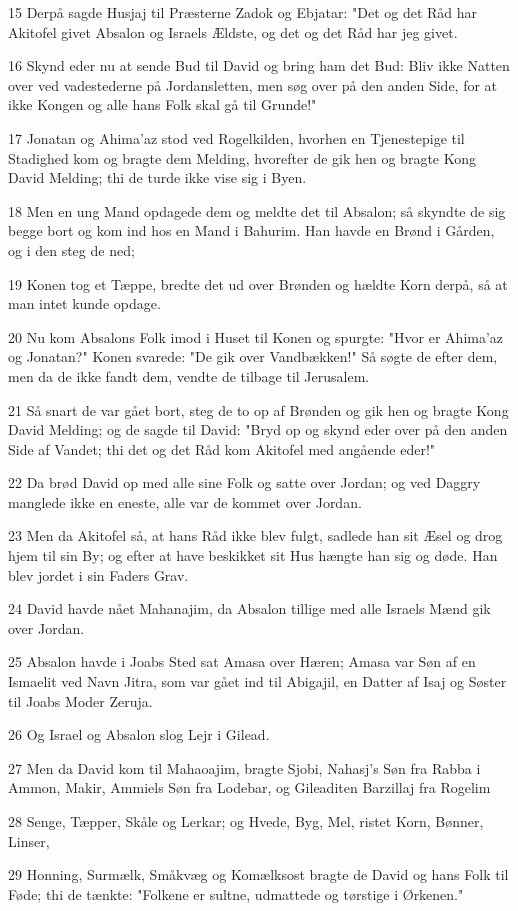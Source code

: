 \par 15 Derpå sagde Husjaj til Præsterne Zadok og Ebjatar: "Det og det Råd har Akitofel givet Absalon og Israels Ældste, og det og det Råd har jeg givet.
\par 16 Skynd eder nu at sende Bud til David og bring ham det Bud: Bliv ikke Natten over ved vadestederne på Jordansletten, men søg over på den anden Side, for at ikke Kongen og alle hans Folk skal gå til Grunde!"
\par 17 Jonatan og Ahima'az stod ved Rogelkilden, hvorhen en Tjenestepige til Stadighed kom og bragte dem Melding, hvorefter de gik hen og bragte Kong David Melding; thi de turde ikke vise sig i Byen.
\par 18 Men en ung Mand opdagede dem og meldte det til Absalon; så skyndte de sig begge bort og kom ind hos en Mand i Bahurim. Han havde en Brønd i Gården, og i den steg de ned;
\par 19 Konen tog et Tæppe, bredte det ud over Brønden og hældte Korn derpå, så at man intet kunde opdage.
\par 20 Nu kom Absalons Folk imod i Huset til Konen og spurgte: "Hvor er Ahima'az og Jonatan?" Konen svarede: "De gik over Vandbækken!" Så søgte de efter dem, men da de ikke fandt dem, vendte de tilbage til Jerusalem.
\par 21 Så snart de var gået bort, steg de to op af Brønden og gik hen og bragte Kong David Melding; og de sagde til David: "Bryd op og skynd eder over på den anden Side af Vandet; thi det og det Råd kom Akitofel med angående eder!"
\par 22 Da brød David op med alle sine Folk og satte over Jordan; og ved Daggry manglede ikke en eneste, alle var de kommet over Jordan.
\par 23 Men da Akitofel så, at hans Råd ikke blev fulgt, sadlede han sit Æsel og drog hjem til sin By; og efter at have beskikket sit Hus hængte han sig og døde. Han blev jordet i sin Faders Grav.
\par 24 David havde nået Mahanajim, da Absalon tillige med alle Israels Mænd gik over Jordan.
\par 25 Absalon havde i Joabs Sted sat Amasa over Hæren; Amasa var Søn af en Ismaelit ved Navn Jitra, som var gået ind til Abigajil, en Datter af Isaj og Søster til Joabs Moder Zeruja.
\par 26 Og Israel og Absalon slog Lejr i Gilead.
\par 27 Men da David kom til Mahaoajim, bragte Sjobi, Nahasj's Søn fra Rabba i Ammon, Makir, Ammiels Søn fra Lodebar, og Gileaditen Barzillaj fra Rogelim
\par 28 Senge, Tæpper, Skåle og Lerkar; og Hvede, Byg, Mel, ristet Korn, Bønner, Linser,
\par 29 Honning, Surmælk, Småkvæg og Komælksost bragte de David og hans Folk til Føde; thi de tænkte: "Folkene er sultne, udmattede og tørstige i Ørkenen."

